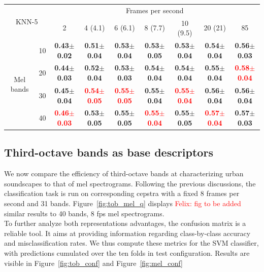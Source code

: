 \documentclass[final,3p,times,twocolumn]{elsarticle}
\newcommand{\fg}[1]{\textcolor{red}{ Felix: #1}}
\begin{document}
\begin{table}[h]
\begin{tabular}{ll|c|c|c|c|c|c|c|}
\cline{3-9}
\multicolumn{2}{c}{\multirow{2}{*}{KNN-5}} & \multicolumn{7}{|c|}{Frames per second}\\ \cline{3-9}
 & & 2 & 4 (4.1) & 6 (6.1) & 8 (7.7) & 10 (9.5) & 20 (21) & 85 \\ \cline{1-9}
\multicolumn{1}{|c}{\multirow{4}{*}{Mel bands}}
 & \multicolumn{1}{|c|}{10} & \textbf{0.43$\pm$0.02} & \textbf{0.51$\pm$0.04} & \textbf{0.53$\pm$0.04} & \textbf{0.53$\pm$0.05} & \textbf{0.53$\pm$0.04} & \textbf{0.54$\pm$0.04} & \textbf{0.56$\pm$0.03} \\ \cline{2-9}
\multicolumn{1}{|c}{}
 & \multicolumn{1}{|c|}{20} & \textbf{0.44$\pm$0.03} & \textbf{0.52$\pm$0.04} & \textbf{0.53$\pm$0.03} & \textbf{0.54$\pm$0.04} & \textbf{0.54$\pm$0.04} & \textbf{0.55$\pm$0.04} & \textbf{\textcolor{red}{0.58$\pm$0.04}} \\ \cline{2-9}
\multicolumn{1}{|c}{}
 & \multicolumn{1}{|c|}{30} & \textbf{0.45$\pm$0.04} & \textbf{\textcolor{red}{0.54$\pm$0.05}} & \textbf{\textcolor{red}{0.55$\pm$0.05}} & \textbf{0.55$\pm$0.04} & \textbf{\textcolor{red}{0.55$\pm$0.04}} & \textbf{0.56$\pm$0.04} & \textbf{0.56$\pm$0.04} \\ \cline{2-9}
\multicolumn{1}{|c}{}
 & \multicolumn{1}{|c|}{40} & \textbf{\textcolor{red}{0.46$\pm$0.03}} & \textbf{0.53$\pm$0.05} & \textbf{0.55$\pm$0.05} & \textbf{\textcolor{red}{0.55$\pm$0.04}} & \textbf{0.55$\pm$0.05} & \textbf{\textcolor{red}{0.57$\pm$0.04}} & \textbf{0.57$\pm$0.03} \\ \cline{1-9}
\end{tabular}
\end{table}


\subsection{Third-octave bands as base descriptors}

We now compare the efficiency of third-octave bands at characterizing urban soundscapes to that of mel spectrograms. Following the previous discussions, the classification task is run on corresponding cepstra with a fixed 8 frames per second and 31 bands. Figure~\ref{fig:tob_mel_q} displays \fg{fig to be added} similar results to 40 bands, 8 fps mel spectrograms.\\

To further analyze both representations advantages, the confusion matrix is a reliable tool. It aims at providing information regarding class-by-class accuracy and misclassification rates. We thus compute these metrics for the SVM classifier, with predictions cumulated over the ten folds in test configuration. Results are visible in Figure~\ref{fig:tob_conf} and Figure~\ref{fig:mel_conf}
\end{document}
